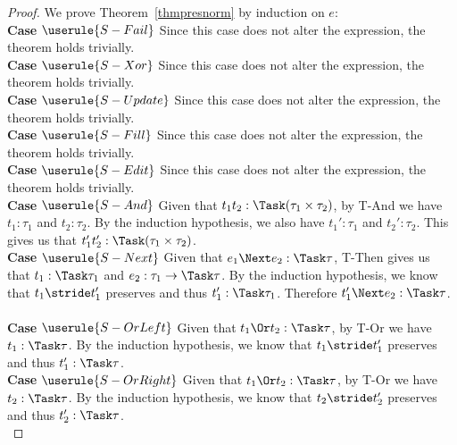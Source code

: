 \begin{proof}
  We prove Theorem~\ref{thmpresnorm} by induction on $e$:\\

  \noindent\textbf{Case} $\userule{S-Fail}$ Since this case does not alter the
  expression, the theorem holds trivially.\\

  \noindent\textbf{Case} $\userule{S-Xor}$ Since this case does not alter the
  expression, the theorem holds trivially.\\

  \noindent\textbf{Case} $\userule{S-Update}$ Since this case does not alter
  the expression, the theorem holds trivially.\\

  \noindent\textbf{Case} $\userule{S-Fill}$ Since this case does not alter the
  expression, the theorem holds trivially.\\

  \noindent\textbf{Case} $\userule{S-Edit}$ Since this case does not alter the
  expression, the theorem holds trivially.\\

  \noindent\textbf{Case} $\userule{S-And}$ Given that $t_1\And t_2:\Task(\tau_1\times\tau_2)$, by T-And we have $t_1:\tau_1$ and $t_2:\tau_2$. By the induction hypothesis, we also have $t_1':\tau_1$ and $t_2':\tau_2$. This gives us that $t_1'\And t_2':\Task(\tau_1\times\tau_2)$.\\

  \noindent\textbf{Case} $\userule{S-Next}$ Given that $e_1\Next e_2:\Task \tau$, T-Then gives us that $t_1:\Task\tau_1$
  and $e_2:\tau_1 \to \Task \tau$. By the induction hypothesis, we know that
  $t_1\stride t_1'$ preserves and thus $t_1':\Task\tau_1$. Therefore
  $t_1'\Next e_2:\Task\tau$.\\\\

  \noindent\textbf{Case} $\userule{S-OrLeft}$ Given that $t_1\Or t_2:\Task\tau$,
  by T-Or we have $t_1:\Task\tau$. By the induction hypothesis, we know that
  $t_1\stride t_1'$ preserves and thus $t_1':\Task\tau$.\\

  \noindent\textbf{Case} $\userule{S-OrRight}$ Given that $t_1\Or t_2:\Task\tau$,
  by T-Or we have $t_2:\Task\tau$. By the induction hypothesis, we know that
  $t_2\stride t_2'$ preserves and thus $t_2':\Task\tau$. \\


\end{proof}
